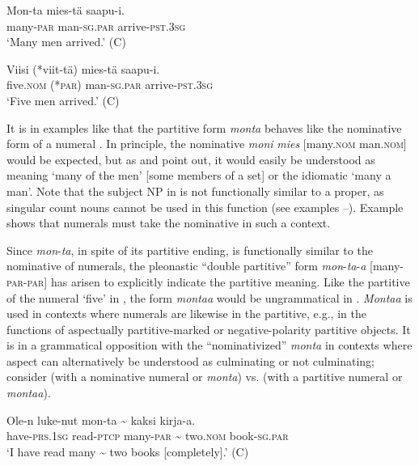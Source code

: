 \documentclass[output=paper]{LSP/langsci}
\begin{document}
\ea%
\label{15-hu-ex:52}

\gll Mon-ta mies-tä saapu-i.\\
many-\textsc{par} man-\textsc{sg}.\textsc{par} arrive-\textsc{pst}.\textsc{3sg}\\
\glt `Many men arrived.’  (C)
\z

\ea%
\label{15-hu-ex:53}

\gll Viisi (*viit-tä) mies-tä saapu-i.\\
five.\textsc{nom} (*\textsc{par}) man-\textsc{sg}.\textsc{par} arrive-\textsc{pst}.\textsc{3sg}\\
\glt `Five men arrived.’  (C)
\z

It is in examples like  that the partitive form \textit{monta} behaves like the nominative form of a numeral . In principle, the nominative \textit{moni} \textit{mies} [many.\textsc{nom} man.\textsc{nom]} would be expected, but as \citet{Yli-Vakkuri1979Partitiivisubjektin} and \citet{Branch2001Montaa} point out, it would easily be understood as meaning ‘many of the men’ [\ie  some members of a  set] or the idiomatic ‘many a man’. Note that the subject NP in  is not functionally similar to a  proper, as singular count nouns cannot be used in this function (see examples --). Example  shows that numerals must take the nominative in such a context. 

Since \textit{mon}-\textit{ta}, in spite of its partitive ending, is functionally similar to the nominative of numerals, the pleonastic “double partitive” form \textit{mon}-\textit{ta}-\textit{a} [many-\textsc{par}-\textsc{par}] has arisen to explicitly indicate the partitive meaning. Like the partitive of the numeral ‘five’ in , the form \textit{montaa} would be ungrammatical in . \textit{Montaa} is used in contexts where numerals are likewise in the partitive, e.g., in the functions of aspectually partitive-marked or negative-polarity partitive objects. It is in a grammatical opposition with the “nominativized” \textit{monta} in contexts where aspect can alternatively be understood as culminating or not culminating; consider  (with a nominative numeral or \textit{monta}) vs.  (with a partitive numeral or \textit{montaa}).

\ea%
\label{15-hu-ex:54}

\gll Ole-n luke-nut mon-ta {\textasciitilde} kaksi kirja-a.\\
have-\textsc{prs}.\textsc{1sg} read-\textsc{ptcp} many-\textsc{par} {\textasciitilde} two.\textsc{nom} book-\textsc{sg}.\textsc{par}\\
\glt ‘I have read many {\textasciitilde} two books [completely].’  (C)
\z
\end{document}
